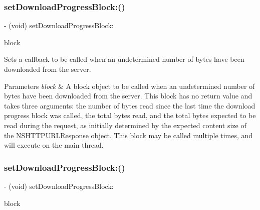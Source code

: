 \subsubsection{\texorpdfstring{set\+Download\+Progress\+Block\+:()}{setDownloadProgressBlock:()}\hspace{0.1cm}{\footnotesize\ttfamily [1/3]}}
{\footnotesize\ttfamily -\/ (void) set\+Download\+Progress\+Block\+: \begin{DoxyParamCaption}\item[{(nullable void($^\wedge$)(N\+S\+U\+Integer bytes\+Read, long long total\+Bytes\+Read, long long total\+Bytes\+Expected\+To\+Read))}]{block }\end{DoxyParamCaption}}

Sets a callback to be called when an undetermined number of bytes have been downloaded from the server.


\begin{DoxyParams}{Parameters}
{\em block} & A block object to be called when an undetermined number of bytes have been downloaded from the server. This block has no return value and takes three arguments\+: the number of bytes read since the last time the download progress block was called, the total bytes read, and the total bytes expected to be read during the request, as initially determined by the expected content size of the {\ttfamily N\+S\+H\+T\+T\+P\+U\+R\+L\+Response} object. This block may be called multiple times, and will execute on the main thread. \\
\hline
\end{DoxyParams}
\mbox{\label{interface_a_f_u_r_l_connection_operation_a0a6df99ee90311173f0a55248ccf19cb}} 
\subsubsection{\texorpdfstring{set\+Download\+Progress\+Block\+:()}{setDownloadProgressBlock:()}\hspace{0.1cm}{\footnotesize\ttfamily [2/3]}}
{\footnotesize\ttfamily -\/ (void) set\+Download\+Progress\+Block\+: \begin{DoxyParamCaption}\item[{(nullable void($^\wedge$)(N\+S\+U\+Integer bytes\+Read, long long total\+Bytes\+Read, long long total\+Bytes\+Expected\+To\+Read))}]{block }\end{DoxyParamCaption}}

